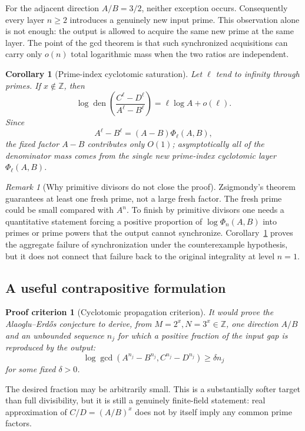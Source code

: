 \documentclass[11pt,oneside]{article}
\newtheorem{corollary}[theorem]{Corollary}
\newtheorem{criterion}[theorem]{Proof criterion}
\theoremstyle{definition}
\theoremstyle{remark}
\newtheorem{remark}[theorem]{Remark}
\newcommand{\Z}{\mathbb Z}
\newcommand{\den}{\operatorname{den}}
\newcommand{\AEconj}{Alaoglu--Erd\H{o}s}
\begin{document}
For the adjacent direction $A/B=3/2$, neither exception occurs.  Consequently every layer
$n\ge2$ introduces a genuinely new input prime.  This observation alone is not enough:
the output is allowed to acquire the same new prime at the same layer.  The point of the
gcd theorem is that such synchronized acquisitions can carry only $o(n)$ total logarithmic
mass when the two ratios are independent.

\begin{corollary}[Prime-index cyclotomic saturation]
\label{cor:prime-layer}
Let $\ell$ tend to infinity through primes.  If $x\notin\Z$, then
\[
 \log\den\!\left(\frac{C^\ell-D^\ell}{A^\ell-B^\ell}\right)
   =\ell\log A+o(\ell).
\]
Since
\[
 A^\ell-B^\ell=(A-B)\Phi_\ell(A,B),
\]
the fixed factor $A-B$ contributes only $O(1)$; asymptotically all of the denominator mass
comes from the single new prime-index cyclotomic layer $\Phi_\ell(A,B)$.
\end{corollary}

\begin{remark}[Why primitive divisors do not close the proof]
Zsigmondy's theorem guarantees at least one fresh prime, not a large fresh factor.  The fresh
prime could be small compared with $A^n$.  To finish by primitive divisors one needs a
quantitative statement forcing a positive proportion of $\log\Phi_n(A,B)$ into primes or
prime powers that the output cannot synchronize.  Corollary~\ref{cor:prime-layer} proves the
aggregate failure of synchronization under the counterexample hypothesis, but it does not
connect that failure back to the original integrality at level $n=1$.
\end{remark}

\subsection{A useful contrapositive formulation}

\begin{criterion}[Cyclotomic propagation criterion]
\label{crit:cyclotomic-propagation}
It would prove the \AEconj{} conjecture to derive, from $M=2^x,N=3^x\in\Z$, one direction
$A/B$ and an unbounded sequence $n_j$ for which a positive fraction of the input gap is
reproduced by the output:
\[
 \log\gcd(A^{n_j}-B^{n_j},C^{n_j}-D^{n_j})\ge\delta n_j
\]
for some fixed $\delta>0$.
\end{criterion}

The desired fraction may be arbitrarily small.  This is a substantially softer target than
full divisibility, but it is still a genuinely finite-field statement: real approximation
of $C/D=(A/B)^x$ does not by itself imply any common prime factors.
\end{document}
